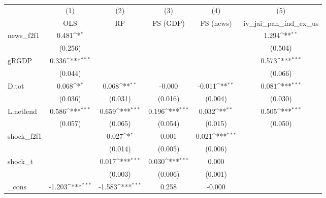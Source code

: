 {
\def\sym#1{\ifmmode^{#1}\else\(^{#1}\)\fi}
\begin{tabular}{l*{5}{c}}
\toprule
            &\multicolumn{1}{c}{(1)}&\multicolumn{1}{c}{(2)}&\multicolumn{1}{c}{(3)}&\multicolumn{1}{c}{(4)}&\multicolumn{1}{c}{(5)}\\
            &\multicolumn{1}{c}{OLS}&\multicolumn{1}{c}{RF}&\multicolumn{1}{c}{FS (GDP)}&\multicolumn{1}{c}{FS (news)}&\multicolumn{1}{c}{iv\_jai\_pan\_ind\_ex\_us}\\
\midrule
news\_f2f1   &       0.481\sym{*}  &                     &                     &                     &       1.294\sym{**} \\
            &     (0.256)         &                     &                     &                     &     (0.504)         \\
\addlinespace
gRGDP       &       0.336\sym{***}&                     &                     &                     &       0.573\sym{***}\\
            &     (0.044)         &                     &                     &                     &     (0.066)         \\
\addlinespace
D.tot       &       0.068\sym{*}  &       0.068\sym{**} &      -0.000         &      -0.011\sym{**} &       0.081\sym{***}\\
            &     (0.036)         &     (0.031)         &     (0.016)         &     (0.004)         &     (0.030)         \\
\addlinespace
L.netlend   &       0.586\sym{***}&       0.659\sym{***}&       0.196\sym{***}&       0.032\sym{**} &       0.505\sym{***}\\
            &     (0.057)         &     (0.065)         &     (0.054)         &     (0.015)         &     (0.050)         \\
\addlinespace
shock\_f2f1  &                     &       0.027\sym{*}  &       0.001         &       0.021\sym{***}&                     \\
            &                     &     (0.014)         &     (0.005)         &     (0.006)         &                     \\
\addlinespace
shock\_t     &                     &       0.017\sym{***}&       0.030\sym{***}&       0.000         &                     \\
            &                     &     (0.003)         &     (0.006)         &     (0.001)         &                     \\
\addlinespace
\_cons      &      -1.203\sym{***}&      -1.583\sym{***}&       0.258         &      -0.000         &                     \\

\end{tabular}}
